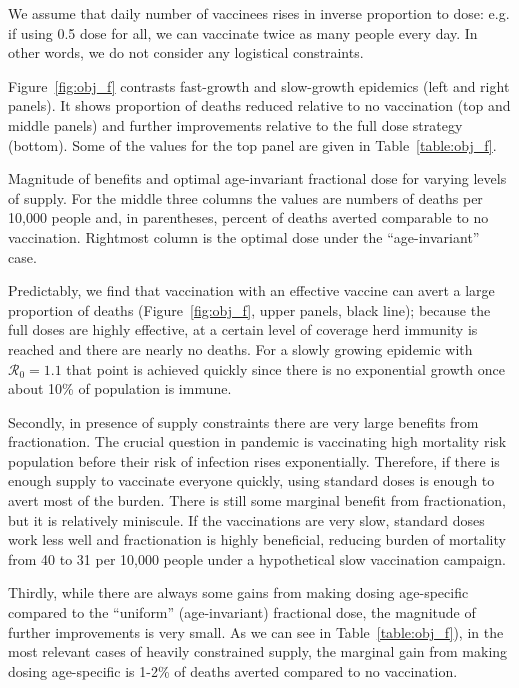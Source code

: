 \documentclass[12pt]{article}
\begin{document}
\begin{spacing}{1.56}
\begin{itemize}
\end{itemize}

We assume that daily number of vaccinees rises in inverse proportion to dose: e.g. if using 0.5 dose for all, we can vaccinate twice as many people every day. In other words, we do not consider any logistical constraints.

Figure~\ref{fig:obj_f} contrasts fast-growth and slow-growth epidemics (left and right panels). It shows proportion of deaths reduced relative to no vaccination (top and middle panels) and further improvements relative to the full dose strategy (bottom). Some of the values for the top panel are given in Table~\ref{table:obj_f}. 


\begin{table}
\centering

\caption{Magnitude of benefits and optimal age-invariant fractional dose for varying levels of supply. For the middle three columns the values are numbers of deaths per 10,000 people and, in parentheses, percent of deaths averted comparable to no vaccination. Rightmost column is the optimal dose under the ``age-invariant'' case.}
\label{table:obj_f}
\end{table}

Predictably, we find that vaccination with an effective vaccine can avert a large proportion of deaths (Figure~\ref{fig:obj_f}, upper panels, black line); because the full doses are highly effective, at a certain level of coverage herd immunity is reached and there are nearly no deaths. For a slowly growing epidemic with $\mathcal{R}_0 = 1.1$ that point is achieved quickly since there is no exponential growth once about 10\% of population is immune. 

Secondly, in presence of supply constraints there are very large benefits from fractionation. The crucial question in pandemic is vaccinating high mortality risk population before their risk of infection rises exponentially. Therefore, if there is enough supply to vaccinate everyone quickly, using standard doses is enough to avert most of the burden. There is still some marginal benefit from fractionation, but it is relatively miniscule. If the vaccinations are very slow, standard doses work less well and fractionation is highly beneficial, reducing burden of mortality from 40 to 31 per 10,000 people under a hypothetical slow vaccination campaign. 

Thirdly, while there are always some gains from making dosing age-specific compared to the ``uniform'' (age-invariant) fractional dose, the magnitude of further improvements is very small. As we can see in Table~\ref{table:obj_f}), in the most relevant cases of heavily constrained supply, the marginal gain from making dosing age-specific is 1-2\% of deaths averted compared to no vaccination. 


\end{spacing}
\end{document}

